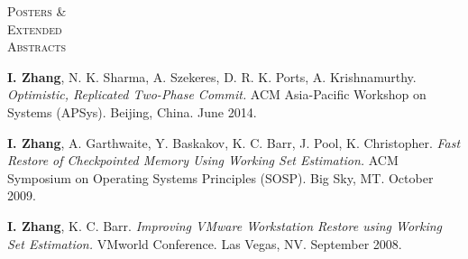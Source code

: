 \documentclass[10pt,times]{report}
\newlength{\sectiongap}
\newlength{\sectioncolwidth}
\newlength{\colgap}
\newlength{\stuffwidth}
\newenvironment{rtable}{
  \begin{minipage}{\textwidth}
  }{
  \end{minipage}
}
\newenvironment{rsection}[1]{
  \begin{minipage}[t]{\sectioncolwidth}
    \textsc{#1}
  \end{minipage}
  \hspace{\colgap}
  \begin{minipage}[t]{\stuffwidth}
  }{
    \removelastskip
  \end{minipage}
  \\[\sectiongap]
}
\begin{document}
\begin{rtable}
  \begin{rsection}{Posters \&\\Extended\\Abstracts}
    \textbf{I. Zhang}, N. K. Sharma, A. Szekeres, D. R. K. Ports,
    A. Krishnamurthy. \textit{Optimistic, Replicated Two-Phase
      Commit.}  ACM Asia-Pacific Workshop on Systems (APSys). Beijing,
    China. June 2014.\\\vspace{-.5em}

    \textbf{I. Zhang}, A. Garthwaite, Y. Baskakov, K. C. Barr, J.
    Pool, K. Christopher. \textit{Fast Restore of Checkpointed Memory
      Using Working Set Estimation.} ACM Symposium on Operating
    Systems Principles (SOSP).  Big Sky, MT. October
    2009.\\\vspace{-0.5em}

    \textbf{I. Zhang}, K. C. Barr.  \textit{Improving VMware
      Workstation Restore using Working Set Estimation.}  VMworld
    Conference. Las Vegas, NV. September 2008.\\
  \end{rsection}


\end{rtable}
\end{document}
